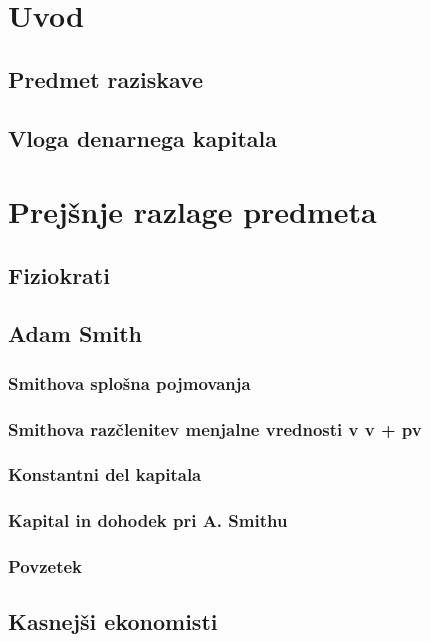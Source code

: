 \documentclass[a5paper]{scrbook}
\begin{document}
\chapter{Uvod}

\section{Predmet raziskave}

\section{Vloga denarnega kapitala}

\chapter{Prejšnje razlage predmeta}

\section{Fiziokrati}

\section{Adam Smith}

\subsection{Smithova splošna pojmovanja}

\subsection{Smithova razčlenitev menjalne vrednosti v v + pv}

\subsection{Konstantni del kapitala}

\subsection{Kapital in dohodek pri A. Smithu}

\subsection{Povzetek}

\section{Kasnejši ekonomisti}
\end{document}
